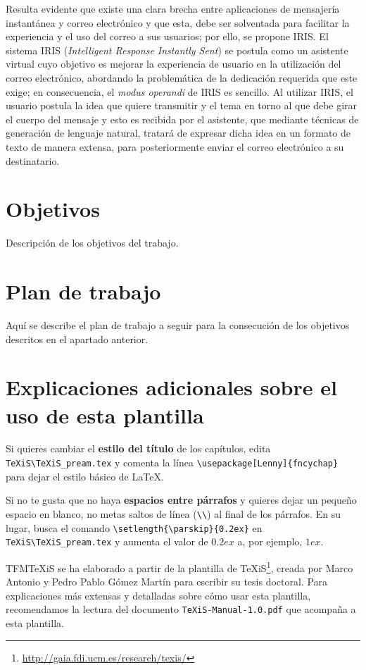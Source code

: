 Resulta evidente que existe una clara brecha entre aplicaciones de mensajería instantánea y correo electrónico y que esta, debe ser solventada para facilitar la experiencia y el uso del correo a sus usuarios; por ello, se propone IRIS. El sistema IRIS (\textit{Intelligent Response Instantly Sent}) se postula como un asistente virtual cuyo objetivo es mejorar la experiencia de usuario en la utilización del correo electrónico, abordando la problemática de la dedicación requerida que este exige; en consecuencia, el \textit{modus operandi} de IRIS es sencillo. Al utilizar IRIS, el usuario postula la idea que quiere transmitir y el tema en torno al que debe girar el cuerpo del mensaje y esto es recibida por el asistente, que mediante técnicas de generación de lenguaje natural, tratará de expresar dicha idea en un formato de texto de manera extensa, para posteriormente enviar el correo electrónico a su destinatario.


\section{Objetivos}
Descripción de los objetivos del trabajo.


\section{Plan de trabajo}
Aquí se describe el plan de trabajo a seguir para la consecución de los objetivos descritos en el apartado anterior.



\section{Explicaciones adicionales sobre el uso de esta plantilla}
Si quieres cambiar el \textbf{estilo del título} de los capítulos, edita \verb|TeXiS\TeXiS_pream.tex| y comenta la línea \verb|\usepackage[Lenny]{fncychap}| para dejar el estilo básico de \LaTeX.

Si no te gusta que no haya \textbf{espacios entre párrafos} y quieres dejar un pequeño espacio en blanco, no metas saltos de línea (\verb|\\|) al final de los párrafos. En su lugar, busca el comando  \verb|\setlength{\parskip}{0.2ex}| en \verb|TeXiS\TeXiS_pream.tex| y aumenta el valor de $0.2ex$ a, por ejemplo, $1ex$.

TFMTeXiS se ha elaborado a partir de la plantilla de TeXiS\footnote{\url{http://gaia.fdi.ucm.es/research/texis/}}, creada por Marco Antonio y Pedro Pablo Gómez Martín para escribir su tesis doctoral. Para explicaciones más extensas y detalladas sobre cómo usar esta plantilla, recomendamos la lectura del documento \texttt{TeXiS-Manual-1.0.pdf} que acompaña a esta plantilla.
